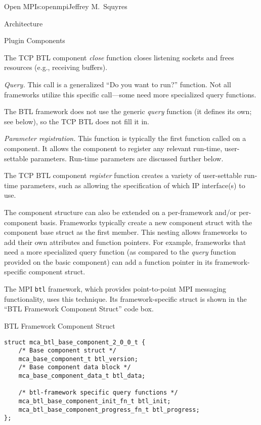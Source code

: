 \begin{aosachapter}{Open MPI}{s:openmpi}{Jeffrey M.\ Squyres}
\begin{aosasect1}{Architecture}
\begin{aosasect2}{Plugin Components}
\begin{aosaitemize}
  The TCP BTL component \emph{close} function closes listening sockets
  and frees resources (e.g., receiving buffers).

\item \emph{Query.} This call is a generalized ``Do you want to run?''
  function.  Not all frameworks utilize this specific call---some
  need more specialized query functions.

  The BTL framework does not use the generic \emph{query} function (it
  defines its own; see below), so the TCP BTL does not fill it in.

\item \emph{Parameter registration.} This function is typically the
  first function called on a component.  It allows the component to
  register any relevant run-time, user-settable parameters.  Run-time
  parameters are discussed further below.

  The TCP BTL component \emph{register} function creates a variety of
  user-settable run-time parameters, such as allowing the
  specification of which IP interface(s) to use.
\end{aosaitemize}

The component structure can also be extended on a per-framework and/or
per-component basis.  Frameworks typically create a new component
struct with the component base struct as the first member.
%
This nesting allows frameworks to add their own attributes and
function pointers.  
%
For example, frameworks that need a more specialized query function
(as compared to the \emph{query} function provided on the basic
component) can add a function pointer in its framework-specific
component struct.

The MPI {\tt btl} framework, which provides point-to-point MPI
messaging functionality, uses this technique.  Its framework-specific
struct is shown in the ``BTL Framework Component Struct'' code box.

\begin{aosabox}{BTL Framework Component Struct}
\begin{verbatim}
struct mca_btl_base_component_2_0_0_t {
    /* Base component struct */
    mca_base_component_t btl_version;
    /* Base component data block */
    mca_base_component_data_t btl_data;

    /* btl-framework specific query functions */
    mca_btl_base_component_init_fn_t btl_init;
    mca_btl_base_component_progress_fn_t btl_progress;
};
\end{verbatim}
\end{aosabox}


\end{aosasect2}
\end{aosasect1}
\end{aosachapter}
